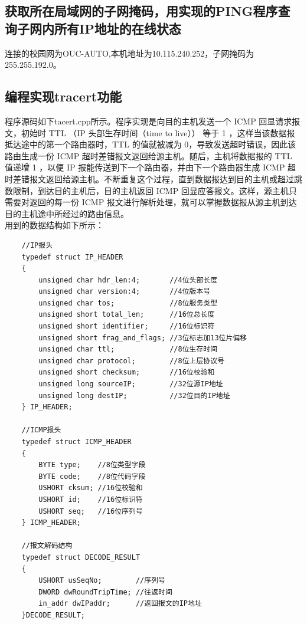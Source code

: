 \documentclass[a4paper,UTF8]{article}
\begin{document}
\subsection{获取所在局域网的子网掩码，用实现的PING程序查询子网内所有IP地址的在线状态}
连接的校园网为OUC-AUTO,本机地址为10.115.240.252，子网掩码为255.255.192.0。
\subsection{编程实现tracert功能}
程序源码如下tacert.cpp所示。程序实现是向目的主机发送一个 ICMP 回显请求报文，初始时 TTL （IP 头部生存时间（time to live）） 等于 1 ，这样当该数据报抵达途中的第一个路由器时，TTL 的值就被减为 0，导致发送超时错误，因此该路由生成一份 ICMP 超时差错报文返回给源主机。随后，主机将数据报的 TTL 值递增 1 ，以便 IP 报能传送到下一个路由器，并由下一个路由器生成 ICMP 超时差错报文返回给源主机。不断重复这个过程，直到数据报达到目的主机或超过跳数限制，到达目的主机后，目的主机返回 ICMP 回显应答报文。这样，源主机只需要对返回的每一份 ICMP 报文进行解析处理，就可以掌握数据报从源主机到达目的主机途中所经过的路由信息。\\
用到的数据结构如下所示：
\begin{lstlisting}
    //IP报头
    typedef struct IP_HEADER
    {
        unsigned char hdr_len:4;       //4位头部长度
        unsigned char version:4;       //4位版本号
        unsigned char tos;             //8位服务类型
        unsigned short total_len;      //16位总长度
        unsigned short identifier;     //16位标识符
        unsigned short frag_and_flags; //3位标志加13位片偏移
        unsigned char ttl;             //8位生存时间
        unsigned char protocol;        //8位上层协议号
        unsigned short checksum;       //16位校验和
        unsigned long sourceIP;        //32位源IP地址
        unsigned long destIP;          //32位目的IP地址
    } IP_HEADER;

    //ICMP报头
    typedef struct ICMP_HEADER
    {
        BYTE type;    //8位类型字段
        BYTE code;    //8位代码字段
        USHORT cksum; //16位校验和
        USHORT id;    //16位标识符
        USHORT seq;   //16位序列号
    } ICMP_HEADER;

    //报文解码结构
    typedef struct DECODE_RESULT
    {
        USHORT usSeqNo;        //序列号
        DWORD dwRoundTripTime; //往返时间
        in_addr dwIPaddr;      //返回报文的IP地址
    }DECODE_RESULT;
\end{lstlisting}
\end{document}
